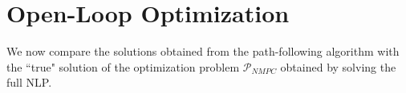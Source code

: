 \section{Open-Loop Optimization}
We now compare the solutions obtained from the path-following algorithm with the ``true" solution of the optimization problem $\mathcal{P}_{NMPC}$ obtained by solving the full NLP.